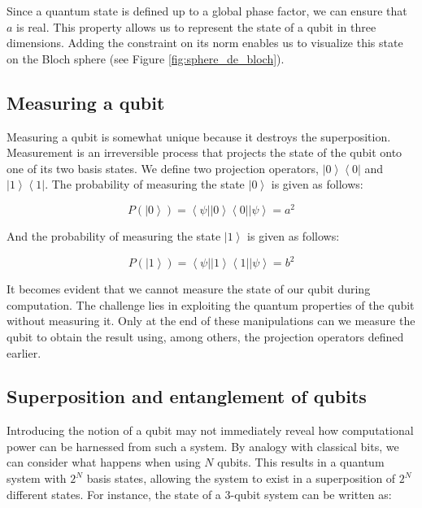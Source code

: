 \documentclass{article}
\begin{document}
\begin{multicols}{2}
Since a quantum state is defined up to a global phase factor, we can ensure that \( a \) is real. This property allows us to represent the state of a qubit in three dimensions. Adding the constraint on its norm enables us to visualize this state on the Bloch sphere (see Figure \autoref{fig:sphere_de_bloch}).

\subsection{Measuring a qubit}

Measuring a qubit is somewhat unique because it destroys the superposition. Measurement is an irreversible process that projects the state of the qubit onto one of its two basis states. We define two projection operators, $\left|0\right>\left<0\right|$ and $\left|1\right>\left<1\right|$. The probability of measuring the state $\left|0\right>$ is given as follows:

\begin{equation}
    P(\left|0\right>) = \left<\psi\right|\left|0\right>\left<0\right|\left|\psi\right> = a^2
\end{equation}

And the probability of measuring the state $\left|1\right>$ is given as follows:

\begin{equation}
    P(\left|1\right>) = \left<\psi\right|\left|1\right>\left<1\right|\left|\psi\right> = b^2
\end{equation}

It becomes evident that we cannot measure the state of our qubit during computation. The challenge lies in exploiting the quantum properties of the qubit without measuring it. Only at the end of these manipulations can we measure the qubit to obtain the result using, among others, the projection operators defined earlier.

\subsection{Superposition and entanglement of qubits}

Introducing the notion of a qubit may not immediately reveal how computational power can be harnessed from such a system. By analogy with classical bits, we can consider what happens when using \( N \) qubits. This results in a quantum system with \( 2^N \) basis states, allowing the system to exist in a superposition of \( 2^N \) different states. For instance, the state of a 3-qubit system can be written as:


\end{multicols}
\end{document}
